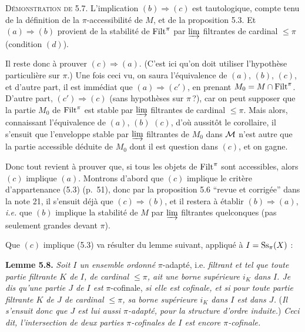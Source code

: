 \textsc{Démonstration de} 5.7. L'implication $(b) \Longrightarrow (c)$ est tautologique, compte tenu de la définition de la $\pi$-accessibilité de $M$, et de la proposition 5.3. Et $(a) \Longrightarrow (b)$ provient de la stabilité de $\mathrm{Filt}^\pi$ par $\varinjlim$ filtrantes de cardinal $\leq \pi$ (condition $(d)$).

Il reste donc à prouver $(c) \Longrightarrow (a)$. (C'est ici qu'on doit utiliser l'hypothèse particulière sur $\pi$.) Une fois ceci vu, on saura l'équivalence de $(a)$, $(b)$, $(c)$, et d'autre part, il est immédiat que $(a) \Longrightarrow (c')$, en
prenant $M_0 = M \cap \mathrm{Filt}^\pi$. D'autre part, $(c') \Longrightarrow (c)$ (sans hypothèses sur $\pi\,$?), car on peut supposer que la partie $M_0$ de $\mathrm{Filt}^\pi$ est stable par $\varinjlim$ filtrantes de cardinal $\leq \pi$. Mais alors, connaissant l'équivalence de $(a)$, $(b)$ $(c)$, d'où aussitôt le corollaire, il s'ensuit que l'enveloppe stable par $\varinjlim$ filtrantes de $M_0$ dans $\mathcal{M}$ n'est autre que la partie accessible déduite de $M_0$ dont il est question dans $(c)$, et on gagne. %

Donc tout revient à prouver que, si tous les objets de $\mathrm{Filt}^\pi$ sont accessibles, alors $(c)$ implique $(a)$. Montrons d'abord que $(c)$ implique le critère d'appartenance (5.3) (p.~51), donc par la proposition 5.6 “revue et corrigée” dans la note 21, il s'ensuit déjà que $(c) \Longrightarrow (b)$, et il restera à établir $(b) \Longrightarrow (a)$, \textit{i.e.} que $(b)$ implique la stabilité de $M$ par $\varinjlim$ filtrantes quelconques (pas seulement grandes devant $\pi$).

Que $(c)$ implique (5.3) va résulter du lemme suivant, appliqué à $I = \mathrm{Ss}_\pi(X)$ :

\textbf{Lemme 5.8.} \textit{Soit $I$ un ensemble ordonné} $\pi$-adapté, i.e. \textit{filtrant et tel que toute partie filtrante $K$ de $I$, de cardinal $\leq \pi$, ait une borne supérieure $i_K$ dans $I$. Je dis qu'une partie $J$ de $I$ est} $\pi$-cofinale, \textit{si elle est cofinale, et si pour toute partie filtrante $K$ de $J$ de cardinal $\leq \pi$, sa borne supérieure $i_K$ dans $I$ est}
\textit{dans $J$.} (\textit{Il s'ensuit donc que $J$ est lui aussi $\pi$-adapté, pour la structure d'ordre induite.}) \textit{Ceci dit, l'intersection de deux parties $\pi$-cofinales de $I$ est encore $\pi$-cofinale.}


